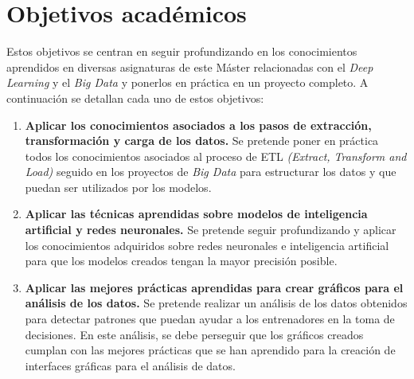  
\section{Objetivos académicos}
Estos objetivos se centran en seguir profundizando en los conocimientos aprendidos en diversas asignaturas de este Máster relacionadas con el \textit{Deep Learning} y el \textit{Big Data} y ponerlos en práctica en un proyecto completo. A continuación se detallan cada uno de estos objetivos:

\begin{enumerate}

    \item \textbf{Aplicar los conocimientos asociados a los pasos de extracción, transformación y carga de los datos.} Se pretende poner en práctica todos los conocimientos asociados al proceso de ETL \textit{(Extract, Transform and Load)} seguido en los proyectos de \textit{Big Data} para estructurar los datos y que puedan ser utilizados por los modelos.
    \item \textbf{Aplicar las técnicas aprendidas sobre modelos de inteligencia artificial y redes neuronales.} Se pretende seguir profundizando y aplicar los conocimientos adquiridos sobre redes neuronales e inteligencia artificial para que los modelos creados tengan la mayor precisión posible.
    
    \item \textbf{Aplicar las mejores prácticas aprendidas para crear gráficos para el análisis de los datos.} Se pretende realizar un análisis de los datos obtenidos para detectar patrones que puedan ayudar a los entrenadores en la toma de decisiones. En este análisis, se debe perseguir que los gráficos creados cumplan con las mejores prácticas que se han aprendido para la creación de interfaces gráficas para el análisis de datos.
    
 \end{enumerate}
